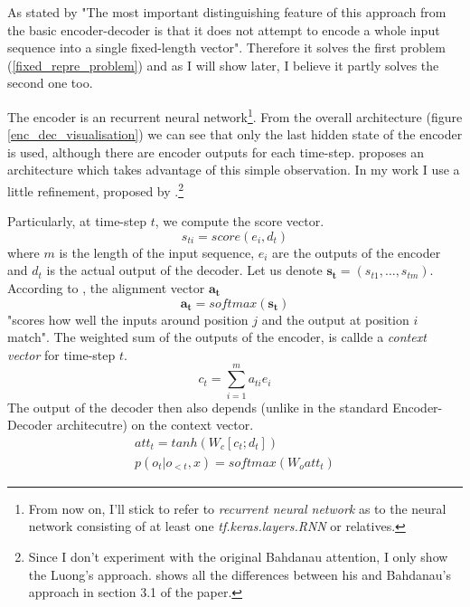 As stated by \citep{bahdanau2016neural} "The most important distinguishing feature of this approach from the basic encoder-decoder is that it does not attempt to encode a whole input sequence into a single fixed-length vector". Therefore it solves the first problem (\ref{fixed_repre_problem}) and as I will show later, I believe it partly solves the second one too.

The encoder is an recurrent neural network\footnote{From now on, I'll stick to refer to \emph{recurrent neural network} as to the neural network consisting of at least one \emph{tf.keras.layers.RNN} or relatives.}. From the overall architecture (figure \ref{enc_dec_visualisation}) we can see that only the last hidden state of the encoder is used, although there are encoder outputs for each time-step. \citep{bahdanau2016neural} proposes an architecture which takes advantage of this simple observation. In my work I use a little refinement, proposed by \citep{luong2015effective}.\footnote{Since I don't experiment with the original Bahdanau attention, I only show the Luong's approach. \citep{luong2015effective} shows all the differences between his and Bahdanau's approach in section 3.1 of the paper.}

Particularly, at time-step $t$, we compute the score vector.
\begin{equation}
    s_{ti} = score(e_i, d_t)
\end{equation}
where $m$ is the length of the input sequence, $e_i$ are the outputs of the encoder and $d_t$ is the actual output of the decoder. Let us denote $\mathbf{s_t} = (s_{t1},\dots,s_{tm})$. According to \citep{bahdanau2016neural}, the alignment vector $\mathbf{a_t}$
\begin{equation}
    \mathbf{a_t} = softmax(\mathbf{s_t})
\end{equation}
"scores how well the inputs around position $j$ and the output at position $i$ match". The weighted sum of the outputs of the encoder, is callde a \emph{context vector} for time-step $t$.
\begin{equation}
    c_t = \sum_{i=1}^m{a_{ti}e_i}
\end{equation}
The output of the decoder then also depends (unlike in the standard Encoder-Decoder architecutre) on the  context vector.
\begin{gather}
    att_t = tanh(W_c[c_t;d_t]) \\
    p(o_t | o_{<t}, x)= softmax(W_o att_t)
\end{gather}

